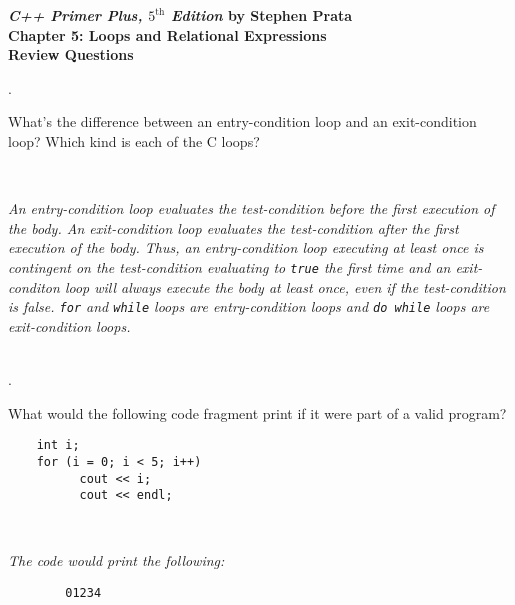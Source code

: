 \documentclass{amsart}
\begin{document}
\begin{center}
	\Large {\bfseries
	\emph{C++ Primer Plus, $5^{\text{th}}$ Edition} by Stephen Prata \\
	Chapter 5: Loops and Relational Expressions \\
	Review Questions} \normalsize \vspace{.5 cm}
\end{center}




. 
\begin{minipage}[t]{11.5 cm}
	What's the difference between an entry-condition loop and an exit-condition loop? Which kind is each of the C\raisebox{0.15ex}{++} loops?
\end{minipage} \\[1ex]
\phantom{3. } 
\begin{minipage}[t]{11.5 cm}
	{\slshape An entry-condition loop evaluates the test-condition before the first execution of the body. An exit-condition loop evaluates the test-condition after the first execution of the body. Thus, an entry-condition loop executing at least once is contingent on the test-condition evaluating to \texttt{true} the first time and an exit-conditon loop will always execute the body at least once, even if the test-condition is false. \texttt{for} and \texttt{while} loops are entry-condition loops and \texttt{do while} loops are exit-condition loops.} 
\end{minipage} 
\\[.2cm]

. 
\begin{minipage}[t]{11.5 cm}
	What would the following code fragment print if it were part of a valid program?
\begin{verbatim}
	int i;
	for (i = 0; i < 5; i++)
	      cout << i;
	      cout << endl;
\end{verbatim}
\end{minipage} \\[1ex]
\phantom{2. } 
\begin{minipage}[t]{11.5 cm}
	{\slshape The code would print the following:}
	\begin{verbatim}
		01234
	\end{verbatim} 
\end{minipage} 
\\[.2cm]
\end{document}
